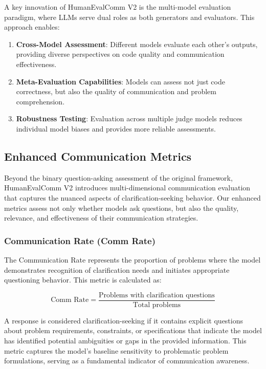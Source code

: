 \documentclass[conference]{IEEEtran}
\begin{document}
A key innovation of HumanEvalComm V2 is the multi-model evaluation paradigm, where LLMs serve dual roles as both generators and evaluators. This approach enables:

\begin{enumerate}
    \item \textbf{Cross-Model Assessment}: Different models evaluate each other's outputs, providing diverse perspectives on code quality and communication effectiveness.
    \item \textbf{Meta-Evaluation Capabilities}: Models can assess not just code correctness, but also the quality of communication and problem comprehension.
    \item \textbf{Robustness Testing}: Evaluation across multiple judge models reduces individual model biases and provides more reliable assessments.
\end{enumerate}

\subsection{Enhanced Communication Metrics}

Beyond the binary question-asking assessment of the original framework, HumanEvalComm V2 introduces multi-dimensional communication evaluation that captures the nuanced aspects of clarification-seeking behavior. Our enhanced metrics assess not only whether models ask questions, but also the quality, relevance, and effectiveness of their communication strategies.

\subsubsection{Communication Rate (Comm Rate)}

The Communication Rate represents the proportion of problems where the model demonstrates recognition of clarification needs and initiates appropriate questioning behavior. This metric is calculated as:

\begin{equation}
\text{Comm Rate} = \frac{\text{Problems with clarification questions}}{\text{Total problems}}
\end{equation}

A response is considered clarification-seeking if it contains explicit questions about problem requirements, constraints, or specifications that indicate the model has identified potential ambiguities or gaps in the provided information. This metric captures the model's baseline sensitivity to problematic problem formulations, serving as a fundamental indicator of communication awareness.
\end{document}

